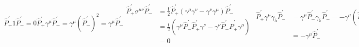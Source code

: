 \documentclass{subnucbo}
\begin{document}
\begin{subequations}
        \begin{equation}
                \hat { P } _ { + } ^ { \prime } 1  \hat { P } _ { - } ^ { \prime } = 0
                \label{subeq:psp}
        \end{equation}
        \begin{equation}
                \hat { P } _ { + } ^ { \prime } \gamma ^ { \mu } \hat { P } _ { - } ^ { \prime } = \gamma ^ { \mu } \left( \hat { P } _ { - } ^ { \prime } \right) ^ { 2 } = \gamma ^ { \mu } \hat { P } _ { - } ^ { \prime }
                \label{subeq:pvp}
        \end{equation}
        \begin{equation}
                \begin{aligned}
                        \hat { P } _ { + } ^ { \prime } \sigma ^ { \mu \nu } \hat { P } _ { - } ^ { \prime } & = \frac { \mathrm { i } } { 2 } \hat { P } _ { + } ^ { \prime } \left( \gamma ^ { \mu } \gamma ^ { \nu } - \gamma ^ { \nu } \gamma ^ { \mu } \right) \hat { P } _ { - } ^ { \prime } \\ & = \frac { \mathrm { i } } { 2 } \left( \gamma ^ { \mu } \hat { P } _ { - } ^ { \prime } \hat { P } _ { + } ^ { \prime } \gamma ^ { \nu } - \gamma ^ { \nu } \hat { P } _ { - } ^ { \prime } \hat { P } _ { + } ^ { \prime } \gamma ^ { \mu } \right) \\ & = 0
                \end{aligned}
                \label{subeq:ptp}
        \end{equation}
        \begin{equation}
                \begin{aligned}
                        \hat { P } _ { + } ^ { \prime } \gamma ^ { \mu } \gamma _ { 5 } \hat { P } _ { - } ^ { \prime } & = \gamma ^ { \mu } \hat { P } _ { - } ^ { \prime } \gamma _ { 5 } \hat { P } _ { - } ^ { \prime } = - \gamma ^ { \mu } \left( \hat { P } _ { - } ^ { \prime } \right) ^ { 2 } \\ & = - \gamma ^ { \mu } \hat { P } _ { - } ^ { \prime }
                \end{aligned}
                \label{subeq:pap}
        \end{equation}
        \begin{equation}
                \hat { P } _ { + } ^ { \prime } \gamma _ { 5 } \hat { P } _ { - } ^ { \prime } = - \hat { P } _ { + } ^ { \prime } \hat { P } _ { - } ^ { \prime } = 0
                \label{subeq:ppp}
        \end{equation}
\end{subequations}
\end{document}
